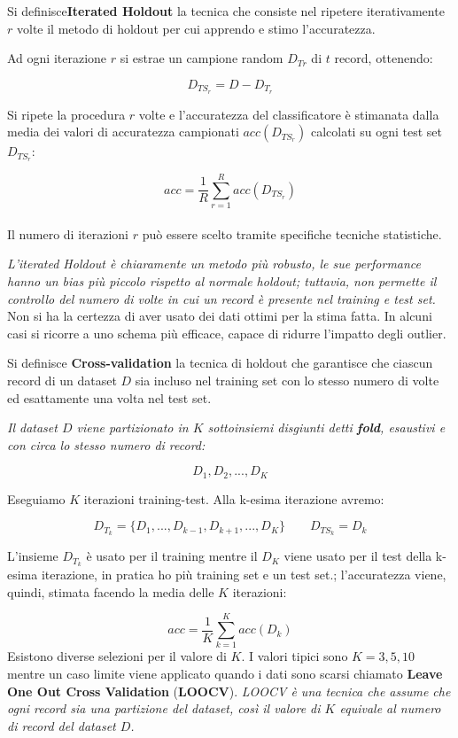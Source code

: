 \begin{defn}
	Si definisce\textbf{Iterated Holdout} la tecnica che consiste nel ripetere iterativamente $r$ volte il metodo di holdout per cui apprendo e stimo l'accuratezza. 
\end{defn}
Ad ogni iterazione $r$ si estrae un campione random $D_{Tr}$ di $t$ record,  ottenendo: 
	
\[D_{TS_r} = D - D_{T_r}\]
	
Si ripete la procedura $r$ volte e l'accuratezza del classificatore è stimanata dalla media dei valori di accuratezza campionati $acc(D_{TS_r})$ calcolati su ogni test set $D_{TS_r}$:
	
\[ acc = \frac{1}{R} \sum_{r=1}^{R}acc(D_{TS_r})\]\\
	
Il numero di iterazioni $r$ può essere scelto tramite specifiche tecniche statistiche.

\textit{L'iterated Holdout è chiaramente un metodo più robusto, le sue performance hanno un bias più piccolo rispetto al normale holdout; tuttavia, non permette il controllo del numero di volte in cui un record è presente nel training e test set.} Non si ha la certezza di aver usato dei dati ottimi per la stima fatta. In alcuni casi si ricorre a uno schema più efficace, capace di ridurre l'impatto degli outlier. 

\begin{defn}
	Si definisce \textbf{Cross-validation} la tecnica di holdout che garantisce che ciascun record di un dataset $D$ sia incluso nel training set con lo stesso numero di volte ed esattamente una volta nel test set. 
\end{defn}
\textit{Il dataset $D$ viene partizionato in $K$ sottoinsiemi disgiunti detti \textbf{fold}, esaustivi e con circa lo stesso numero di record: }

\[D_1, D_2, ..., D_K\]

Eseguiamo $K$ iterazioni training-test. Alla k-esima iterazione avremo:

\[D_{T_k} = \{D_1, ...,D_{k-1},D_{k+1}, ...,D_K\} \qquad D_{TS_k} = D_k\]

L'insieme $D_{T_k}$ è usato per il training  mentre il $D_K$ viene usato per il test della k-esima iterazione, in pratica ho più training set e un test set.; l'accuratezza viene, quindi, stimata facendo la media delle $K$ iterazioni:

\[acc = \frac{1}{K} \sum_{k=1}^K acc(D_k)\]
Esistono diverse selezioni per il valore di $K$. I valori tipici sono $K = 3,5,10$ mentre un caso limite viene applicato quando i dati sono scarsi chiamato \textbf{Leave One Out Cross Validation} (\textbf{LOOCV}). \textit{LOOCV è una tecnica che assume che ogni record sia una partizione del dataset, così il valore di $K$ equivale al numero di record del dataset $D$.}

